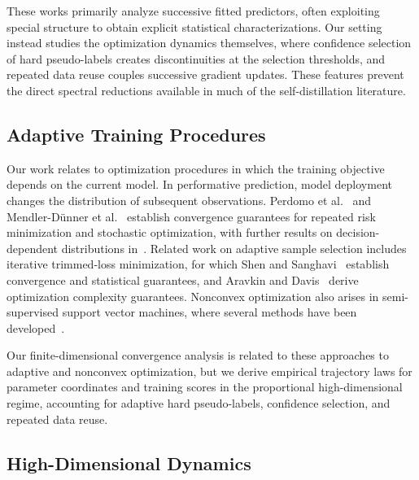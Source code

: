 These works primarily analyze successive fitted predictors,
often exploiting special structure to obtain explicit statistical
characterizations.
Our setting instead studies the optimization dynamics themselves,
where confidence selection of hard pseudo-labels creates
discontinuities at the selection thresholds, and repeated
data reuse couples successive gradient updates.
These features prevent the direct spectral reductions available
in much of the self-distillation literature.

\subsection{Adaptive Training Procedures}
\label{subsec:adapt}

Our work relates to optimization procedures in which the
training objective depends on the current model.
In performative prediction, model deployment changes the
distribution of subsequent observations.
Perdomo et al.~\cite{perdomo2020performative} and
Mendler-D\"unner et al.~\cite{mendlerdunner2020stochastic}
establish convergence guarantees for repeated risk
minimization and stochastic optimization, with further
results on decision-dependent distributions
in~\cite{drusvyatskiy2023stochastic,cutler2024stochastic}.
Related work on adaptive sample selection includes
iterative trimmed-loss minimization, for which
Shen and Sanghavi~\cite{shen2019trimmed} establish
convergence and statistical guarantees, and
Aravkin and Davis~\cite{aravkin2020trimmed} derive
optimization complexity guarantees.
Nonconvex optimization also arises in semi-supervised
support vector machines, where several methods have been
developed~\cite{chapelle2008optimization,
collobert2006large, piccialli2024}.

Our finite-dimensional convergence analysis is related
to these approaches to adaptive and nonconvex optimization, but
we derive empirical trajectory laws for parameter coordinates
and training scores in the proportional high-dimensional regime,
accounting for adaptive hard pseudo-labels, confidence
selection, and repeated data reuse.


\subsection{High-Dimensional Dynamics}
\label{subsec:high-dim-dynamics}

